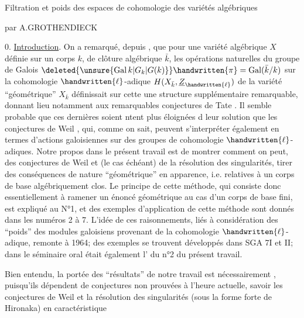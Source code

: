 \begin{center}
Filtration et poids des espaces de cohomologie des variétés algébriques

par A.GROTHENDIECK
\end{center}

0. \uline{Introduction}. On a remarqué, depuis , que pour une variété algébrique $X$ définie sur un corps $k$, de clôture algébrique $\bar{k}$, les opérations naturelles du groupe de Galois $\deleted{\unsure{\operatorname{Gal}k|G_k|G(k)}}\handwritten{\pi}=\operatorname{Gal}(\bar{k}/k)$ sur la cohomologie $\handwritten{\ell}$-adique $H(X_{\bar{k}},\underline{Z}_{\handwritten{\ell}})$ de la variété ``géométrique'' $X_{\bar{k}}$ définissait sur cette  une structure supplémentaire remarquable, donnant lieu notamment aux remarquables conjectures de Tate \handwritten{[\quad]}. Il semble probable que ces dernières soient ntent plus éloignées d leur solution que les conjectures de Weil \handwritten{[\quad,\quad]}, qui, comme on sait, peuvent s'interpréter également en termes d'actions galoisiennes sur des groupes de cohomologie $\handwritten{\ell}$-adiques. Notre propos dans le présent travail est de montrer comment on peut, des conjectures de Weil et (le cas échéant) de la résolution des singularités, tirer des conséquences de nature ``géométrique'' en apparence, i.e. relatives à un corps de base algébriquement clos. Le principe de cette méthode, qui consiste donc essentiellement à ramener un énoncé géométrique au cas d'un corps de base fini, est expliqué au N°1, et des exemples d'application de cette méthode sont donnés dans les numéros 2 à 7.  L'idée de ces raisonnements, liés à considération des ``poids'' des modules galoisiens provenant de la cohomologie $\handwritten{\ell}$-adique, remonte à 1964; des exemples  se trouvent développés dans SGA 7\handwritten{(}I et II\handwritten{)}; dans le séminaire oral était également l' du n°2 du présent travail.

Bien entendu, la portée des ``résultats'' de notre travail est nécessairement , puisqu'ils dépendent de conjectures non prouvées à l'heure actuelle, savoir les conjectures de Weil et la résolution des singularités (sous la forme forte de Hironaka) en caractéristique

